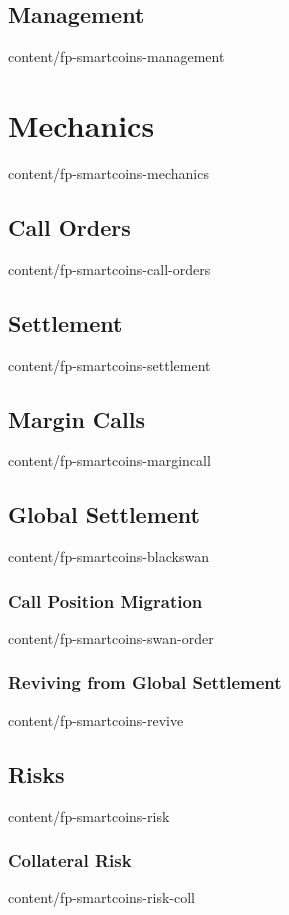 \documentclass{btswhitepaper}
\begin{document}
\subsection    { Management                                       }  { content/fp-smartcoins-management  }

\section       { Mechanics                                        }  { content/fp-smartcoins-mechanics   }
\subsection    { Call Orders                                      }  { content/fp-smartcoins-call-orders }
\subsection    { Settlement                                       }  { content/fp-smartcoins-settlement  }
\subsection    { Margin Calls                                     }  { content/fp-smartcoins-margincall  }

\subsection    { Global Settlement                                }  { content/fp-smartcoins-blackswan   }
\subsubsection { Call Position Migration                          }  { content/fp-smartcoins-swan-order  }
\subsubsection { Reviving from Global Settlement                  }  { content/fp-smartcoins-revive      }

\subsection    { Risks                                            }  { content/fp-smartcoins-risk        }
\subsubsection { Collateral Risk                                  }  { content/fp-smartcoins-risk-coll   }
\end{document}
